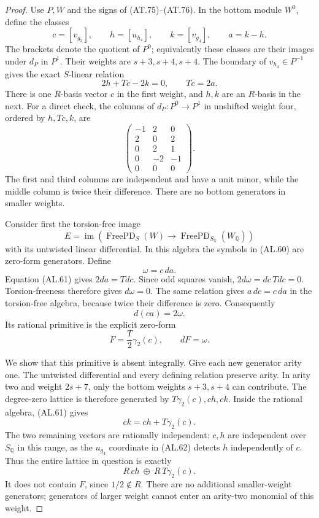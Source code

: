 \begin{proof}
Use $P,W$ and the signs of (AT.75)--(AT.76).
In the bottom module $W^0$, define the classes
\[
 c=[v_{g_3}],\qquad h=[u_{h_4}],\qquad k=[v_{g_4}],
 \qquad a=k-h.
 \tag{AL.60}
\]
The brackets denote the quotient of $P^0$; equivalently
these classes are their images under $d_P$ in $P^1$.
Their weights are $s+3,s+4,s+4$.
The boundary of $v_{h_4}\in P^{-1}$ gives the exact
$S$-linear relation
\[
                    2h+Tc-2k=0,
                 \qquad Tc=2a.                    \tag{AL.61}
\]
There is one $R$-basis vector $c$ in the first
weight, and $h,k$ are an $R$-basis in the next.
For a direct check, the columns of $d_P:P^0\to P^1$
in unshifted weight four, ordered by
$h,Tc,k$, are
\[
 \begin{pmatrix}
 -1&2&0\\
  2&0&2\\
  0&2&1\\
  0&-2&-1\\
  0&0&0
 \end{pmatrix}.                                    \tag{AL.62}
\]
The first and third columns are independent and
have a unit minor, while the middle column is
twice their difference.  There are no bottom
generators in smaller weights.

Consider first the torsion-free image
\[
 E=\operatorname{im}\left(
 \operatorname{FreePD}_{S}(W)\longrightarrow
 \operatorname{FreePD}_{S_{\mathbb Q}}(W_{\mathbb Q})
 \right)
\]
with its untwisted linear differential.  In this
algebra the symbols in (AL.60) are zero-form
generators.  Define
\[
                         \omega=c\,da.
 \tag{AL.63}
\]
Equation (AL.61) gives $2da=Tdc$.  Since odd
squares vanish, $2d\omega=dc\,Tdc=0$.
Torsion-freeness therefore gives $d\omega=0$.
The same relation gives $a\,dc=c\,da$ in the
torsion-free algebra, because twice their difference
is zero.  Consequently
\[
                    d(ca)=2\omega.                 \tag{AL.64}
\]
Its rational primitive is the explicit zero-form
\[
                         F=\frac T2\gamma_2(c),
                         \qquad dF=\omega.         \tag{AL.65}
\]

We show that this primitive is absent integrally.
Give each new generator arity one.  The untwisted
differential and every defining relation preserve
arity.  In arity two and weight $2s+7$, only the
bottom weights $s+3,s+4$ can contribute.  The
degree-zero lattice is therefore generated by
$T\gamma_2(c),ch,ck$.
Inside the rational algebra, (AL.61) gives
\[
                  ck=ch+T\gamma_2(c).
\]
The two remaining vectors are rationally independent:
$c,h$ are independent over $S_{\mathbb Q}$ in this
range, as the $u_{g_4}$ coordinate in (AL.62)
detects $h$ independently of $c$.
Thus the entire lattice in question is exactly
\[
                 R\,ch\ \oplus\ R\,T\gamma_2(c).
 \tag{AL.66}
\]
It does not contain $F$, since $1/2\notin R$.
There are no additional smaller-weight generators;
generators of larger weight cannot enter an arity-two
monomial of this weight.


\end{proof}
